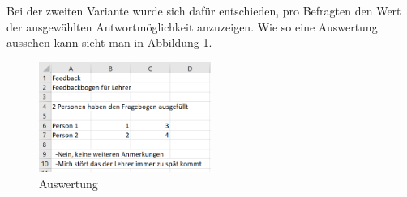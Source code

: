 Bei der zweiten Variante wurde sich dafür entschieden, pro Befragten den Wert der ausgewählten Antwortmöglichkeit
anzuzeigen. Wie so eine Auswertung aussehen kann sieht man in Abbildung \ref{fig:auswertungErgebnis2}.
\begin{figure}[h]
  \centering
    \includegraphics[width=0.5\textwidth]{pics/auswertung2.png}
    \caption{Auswertung}
    \label{fig:auswertungErgebnis2}
\end{figure}

